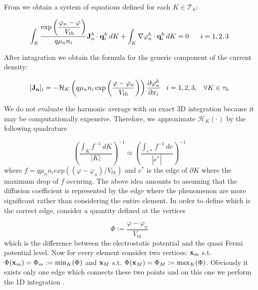 From  we obtain a system of equations defined for each $K \in \mathcal{T}_h$:

\begin{equation}
\label{eq: variation form of current density}
\int_K \dfrac{ \exp \left( \dfrac{\varphi_n-\varphi}{V_{th}} \right) }{q \mu_n n_i} \vect{J}_n^h \cdot \vect{q}^h_i \, dK
 + \int_K \nabla \varphi_n^h \cdot \vect{q}^h_i \, dK = 0 \psp{10}  i=1,2,3
\end{equation}

After intagration we obtain the formula for the generic component of the current density:

\begin{equation}
\label{eq: first formula for J}
[\vect{J_n}]_i = - \mathcal{H}_K \left( q \mu_n n_i \exp \left( \dfrac{\varphi-\varphi_n}{V_{th}} \right)  \right) \dfrac{\partial \varphi_n^h}{\partial x_i} \psp{5} i = 1,2,3, \psp{5} \forall K \in \tau_h
\end{equation}

We do not evaluate the harmonic average with an exact 3D integration because it may be computationally expensive. Therefore, we approximate $\mathcal{H}_K(\cdot)$ by the following quadrature

\begin{equation}
\label{eq: approzimation from 3D to edge}
\left(\dfrac{\int_K f^{-1} \, dK}{|K|} \right)^{-1} \simeq \left(\dfrac{\int_{e*} f^{-1} \, de}{|e^*|} \right)^{-1}
\end{equation}
 where $f=q \mu_n n_i exp((\varphi-\varphi_n)/V_{th})$ and $e^*$ is the edge of $\partial K$ where the maximum drop of $f$ occuring.
 The above idea amounts to assuming that the diffusion coefficient is represented by the edge where the phenomenon are more significant rather than considering the entire element. In order to define which is the correct edge, consider a quantity defined at the vertices

\begin{equation}
\label{eq: differenza tra pot e qf}
\Phi := \dfrac{\varphi - 	\varphi_n}{V_{th}}
\end{equation}
which is the difference between the electrostatic potential and the quasi Fermi potential level. Now for every element consider two vertices: $\mathbf{x}_m$ s.t. $\Phi(\mathbf{x}_m)=\Phi_m := \min_K(\Phi)$ and $\mathbf{x}_M$ s.t. $\Phi(\mathbf{x}_M)=\Phi_M:=\max_K(\Phi)$. Obviously it exists only one edge which connects these two points and on this one we perform the 1D integration .

